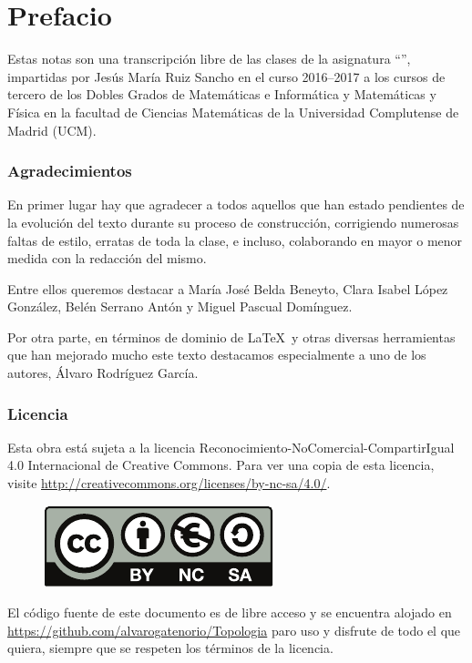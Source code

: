 \chapter*{Prefacio}
\label{pref}
Estas notas son una transcripción libre de las clases de la asignatura ``'', impartidas por Jesús María Ruiz Sancho en el curso 2016--2017 a los cursos de tercero de los Dobles Grados de Matemáticas e Informática y Matemáticas y Física en la facultad de Ciencias Matemáticas de la Universidad Complutense de Madrid (UCM).

\subsection*{Agradecimientos}
En primer lugar hay que agradecer a todos aquellos que han estado pendientes de la evolución del texto durante su proceso de construcción, corrigiendo numerosas faltas de estilo, erratas de toda la clase, e incluso, colaborando en mayor o menor medida con la redacción del mismo.

Entre ellos queremos destacar a María José Belda Beneyto, Clara Isabel López González, Belén Serrano Antón y Miguel Pascual Domínguez.

Por otra parte, en términos de dominio de \LaTeX\ y otras diversas herramientas que han mejorado mucho este texto destacamos especialmente a uno de los autores, Álvaro Rodríguez García.
\subsection*{Licencia}
Esta obra está sujeta a la licencia Reconocimiento-NoComercial-CompartirIgual 4.0 Internacional de Creative Commons. Para ver una copia de esta licencia, visite \url{http://creativecommons.org/licenses/by-nc-sa/4.0/}.
\begin{figure}[h]
	\centering
	\includegraphics[scale=1]{img/licencia}
\end{figure}

El código fuente de este documento es de libre acceso y se encuentra alojado en \url{https://github.com/alvarogatenorio/Topologia} paro uso y disfrute de todo el que quiera, siempre que se respeten los términos de la licencia.
